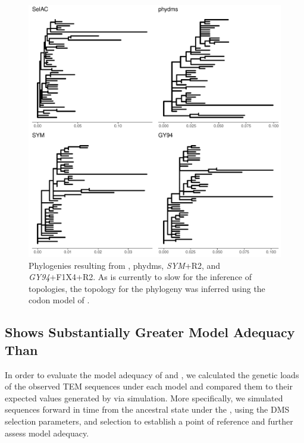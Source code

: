 \documentclass[fleqn,letterpaper]{article}
\begin{document}
\singlespacing
\begin{figure}[H]
     \centering
	\includegraphics[width=\textwidth]{img/phy_TEM2016.pdf}
	\caption{Phylogenies resulting from \selac, phydms, \emph{SYM}+R2, and \emph{GY94}+F1X4+R2. As \selac is currently to slow for the inference of topologies, the topology for the \selac phylogeny was inferred using the codon model of \citet{KosiolEtAl07}.}
	\label{fig:phylo}
\end{figure}
\doublespacing

\subsection{\selac Shows Substantially Greater Model Adequacy Than \phydms}

In order to evaluate the model adequacy of \selac and \phydms, we calculated the genetic loads of the observed TEM sequences under each model and compared them to their expected values generated by via simulation.
More specifically, we simulated sequences forward in time from the ancestral state under the \phydms, using the DMS selection parameters, and \selac selection to establish a point of reference and further assess model adequacy.
\end{document}
